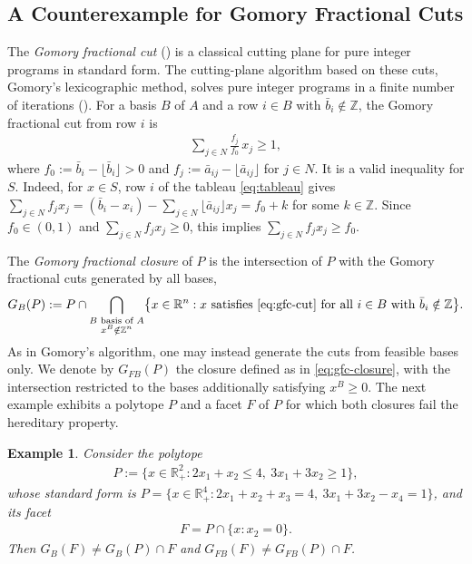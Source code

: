 \documentclass{article}
\newtheorem{example}{Example}
\newcommand{\Z}{\mathbb{Z}}
\newcommand{\R}{\mathbb{R}}
\newcommand{\floor}[1]{\lfloor #1 \rfloor}
\begin{document}
\subsection{A Counterexample for Gomory Fractional Cuts} \label{subsec:counter-gfc}

The \emph{Gomory fractional cut} (\cite{gomory1958outline}) is a classical cutting plane for pure integer programs in standard form. The cutting-plane algorithm based on these cuts, Gomory's lexicographic method, solves pure integer programs in a finite number of iterations (\cite{gomory1963algorithm}). For a basis $B$ of $A$ and a row $i \in B$ with $\bar b_i \notin \Z$, the Gomory fractional cut from row $i$ is
\begin{align}
    \sum_{j \in N} \frac{f_j}{f_0}\, x_j \geq 1, \label{eq:gfc-cut}
\end{align}
where $f_0 := \bar b_i - \floor{\bar b_i} > 0$ and $f_j := \bar a_{ij} - \floor{\bar a_{ij}}$ for $j \in N$. It is a valid inequality for $S$. Indeed, for $x \in S$, row $i$ of the tableau \eqref{eq:tableau} gives $\sum_{j \in N} f_j x_j = (\bar b_i - x_i) - \sum_{j \in N} \floor{\bar a_{ij}} x_j = f_0 + k$ for some $k \in\Z$. Since $f_0 \in (0,1)$ and $\sum_{j \in N} f_j x_j \geq 0$, this implies $\sum_{j \in N} f_j x_j \geq f_0$.

The \emph{Gomory fractional closure} of $P$ is the intersection of $P$ with the Gomory fractional cuts generated by all bases,
\begin{align}
    G_{B}(P) := P \cap \bigcap_{\substack{B \text{ basis of } A \\ x^{B} \notin \Z^n}} \bigl\{x \in \R^n : x \text{ satisfies \eqref{eq:gfc-cut} for all } i \in B \text{ with } \bar b_i \notin \Z\bigr\}. \label{eq:gfc-closure}
\end{align}
As in Gomory's algorithm, one may instead generate the cuts from feasible bases only. We denote by $G_{FB}(P)$ the closure defined as in \eqref{eq:gfc-closure}, with the intersection restricted to the bases additionally satisfying $x^{B} \geq 0$. The next example exhibits a polytope $P$ and a facet $F$ of $P$ for which both closures fail the hereditary property.

\begin{example} \label{ex:gfc}
    Consider the polytope
    \begin{align}
        P := \{x \in \R_+^2 : 2x_1 + x_2 \leq 4, \ 3x_1 + 3x_2 \geq 1\},
    \end{align}
    whose standard form is $P = \{x \in \R_+^4 : 2x_1 + x_2 + x_3 = 4, \ 3x_1 + 3x_2 - x_4 = 1\}$, and its facet
    \begin{align}
        F = P \cap \{x : x_2 = 0\}.
    \end{align}
    Then $G_B(F) \neq G_B(P) \cap F$ and $G_{FB}(F) \neq G_{FB}(P) \cap F$.
\end{example}
\end{document}
